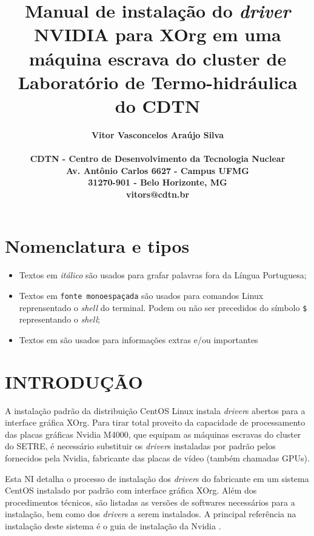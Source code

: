 \documentclass[twoside,a4paper,12pt,english]{inac17}
\title{Manual de instalação do \textit{driver} NVIDIA para XOrg em uma máquina escrava do cluster de Laboratório de Termo-hidráulica do CDTN}
\author{
  \bf{Vitor Vasconcelos Ara\'ujo Silva}\\ \\
  CDTN - Centro de Desenvolvimento da Tecnologia Nuclear\\
  Av. Ant\^onio Carlos 6627 - Campus UFMG\\
  31270-901 - Belo Horizonte, MG\\
  vitors@cdtn.br}
\begin{document}
\maketitle



\pagestyle{myheadings}
\thispagestyle{empty}
\markboth{}{}


\thispagestyle{empty}

\begin{abstract_full_paper}
\end{abstract_full_paper}

\section*{Nomenclatura e tipos}
\begin{itemize}
\item Textos em \textit{itálico} são usados para grafar palavras fora da Língua Portuguesa;
\item Textos em \texttt{fonte monoespaçada} são usados para comandos Linux 
reprensentado o \textit{shell} do terminal. Podem ou não ser precedidos do 
símbolo \texttt{\$} representando o \textit{shell};
\item Textos em  são usados para informações extras e/ou importantes
\end{itemize}
\section{INTRODUÇÃO}\label{int}

A instalação padrão da distribuição CentOS Linux instala \textit{driver}s 
abertos para a interface gráfica XOrg. Para tirar total proveito 
da capacidade de processamento das placas gráficas Nvidia M4000, 
que equipam as máquinas escravas do cluster do SETRE, é necessário 
substituir os \textit{driver}s instaladas por padrão pelos fornecidos pela 
Nvidia, fabricante das placas de vídeo (também chamadas GPUs). 

Esta NI detalha o processo de instalação dos \textit{driver}s do fabricante 
em um sistema CentOS instalado por padrão com interface gráfica XOrg. 
Além dos procedimentos técnicos, são listadas as versões de softwares 
necessários para a instalação, bem como dos \textit{driver}s a serem instalados. A principal referência na instalação deste sistema 
é o guia de instalação da Nvidia \cite{inst-nvidia}.
\end{document}
